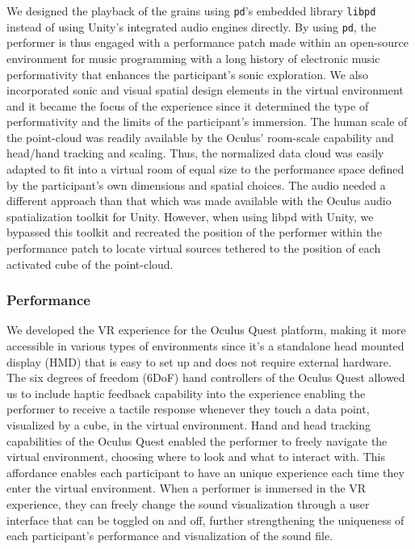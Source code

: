 \documentclass{nime-alternate}
\begin{document}
We designed the playback of the grains using \texttt{pd}’s embedded library \texttt{libpd} instead of using Unity’s integrated audio engines directly. By using \texttt{pd}, the performer is thus engaged with a performance patch made within an open-source environment for music programming with a long history of electronic music performativity that enhances the participant’s sonic exploration. We also incorporated sonic and visual spatial design elements in the virtual environment and it became the focus of the experience since it determined the type of performativity and the limits of the participant’s immersion. The human scale of the point-cloud was readily available by the Oculus’ room-scale capability and head/hand tracking and scaling. Thus, the normalized data cloud was easily adapted to fit into a virtual room of equal size to the performance space defined by the participant's own dimensions and spatial choices. The audio needed a different approach than that which was made available with the Oculus audio spatialization toolkit for Unity. However, when using libpd with Unity, we bypassed this toolkit and recreated the position of the performer within the performance patch to locate virtual sources tethered to the position of each activated cube of the point-cloud. 


\subsubsection{Performance}

We developed the VR experience for the Oculus Quest platform, making it more accessible in various types of environments since it’s a standalone head mounted display (HMD) that is easy to set up and does not require external hardware. The six degrees of freedom (6DoF) hand controllers of the Oculus Quest allowed us to include haptic feedback capability into the experience enabling the performer to receive a  tactile response whenever they touch a data point, visualized by a cube, in the virtual environment. Hand and head tracking capabilities of the Oculus Quest enabled the performer to freely navigate the virtual environment, choosing where to look and what to interact with. This affordance enables each participant to have an unique experience each time they enter the virtual environment. When a performer is immersed in the VR experience, they can freely change the sound visualization through a user interface that can be toggled on and off, further strengthening the uniqueness of each participant's performance and visualization of the sound file. 
\end{document}
